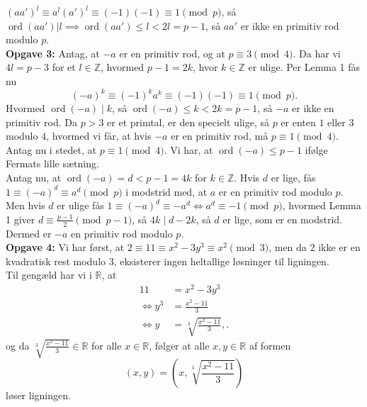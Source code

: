\documentclass[a4paper]{article}
\DeclareMathOperator{\ord}{ord}
\begin{document}
    $(aa')^{l} \equiv a^{l} (a')^{l} \equiv (-1)(-1) \equiv 1 \pmod{p}$, så
    $\ord (aa') | l \implies \ord(aa') \le l < 2l = p-1$, så $aa'$ er ikke en
    primitiv rod modulo $p$.\\
    \linebreak
    \textbf{Opgave 3:} Antag, at $-a$ er en primitiv rod, og at $p \equiv
    3 \pmod{4}$. Da har vi $4l = p-3$ for et $l \in \mathbb{Z}$, hvormed
    $p-1 = 2k$, hvor $k \in \mathbb{Z}$ er ulige. Per Lemma 1 fås nu
    \[
        (-a)^{k} \equiv (-1)^{k} a^{k} \equiv (-1) (-1) \equiv 1 \pmod{p}
    .\] 
    Hvormed $\ord (-a)  \mid k$, så $\ord (-a) \le k < 2k = p-1$, så $-a$ er
    ikke en primitiv rod. Da $p > 3$ er et primtal, er den specielt ulige, så 
    $p$ er enten $1$ eller $3$ modulo $4$, hvormed vi får, at hvis $-a$ er en
    primitiv rod, må $p \equiv
    1 \pmod{4}$.\\
    \linebreak
    Antag nu i stedet, at $p \equiv 1 \pmod{4}$. Vi har, at 
    $\ord (-a) \le p-1$ ifølge Fermats lille sætning.\\
    Antag nu, at $\ord (-a) = d < p-1 = 4k$ for $k \in \mathbb{Z}$. Hvis $d$ er
    lige, fås $1 \equiv (-a)^{d} \equiv a^{d} \pmod{p}$ i modstrid med, at $a$ 
    er en primitiv rod modulo $p$. Men hvis $d$ er ulige fås
    $1 \equiv (-a)^{d} \equiv - a^{d} \iff a^{d} \equiv -1 \pmod{p}$, hvormed
    Lemma 1 giver
    $d \equiv \frac{p-1}{2} \pmod{p-1}$, så $4k  \mid d - 2k$, så $d$ er lige,
    som er en modstrid. Dermed er $-a$ en primitiv rod modulo $p$.\\
    \linebreak
    \textbf{Opgave 4:} Vi har først, at $2 \equiv 11 \equiv x^2 - 3y^{3}
    \equiv x^2 \pmod{3}$, men da $2$ ikke er en kvadratisk rest modulo $3$,
    eksisterer ingen heltallige løsninger til ligningen.\\
    Til gengæld har vi i $\mathbb{R}$, at 
    \begin{align*}
        11 &= x^2 - 3y^{3}\\
        \iff y^{3} &= \frac{x^2 - 11}{3}\\
        \iff y &= \sqrt[3]{\frac{x^2-11}{3}},
    .\end{align*}
    og da $\sqrt[3]{\frac{x^2 -11}{3}} \in \mathbb{R}$ for alle $x\in
    \mathbb{R}$, følger at alle $x,y \in \mathbb{R}$ af formen
    \[
        (x,y) = \left( x, \sqrt[3]{\frac{x^2 - 11}{3}}  \right) 
    \] 
    løser ligningen.
\end{document}
